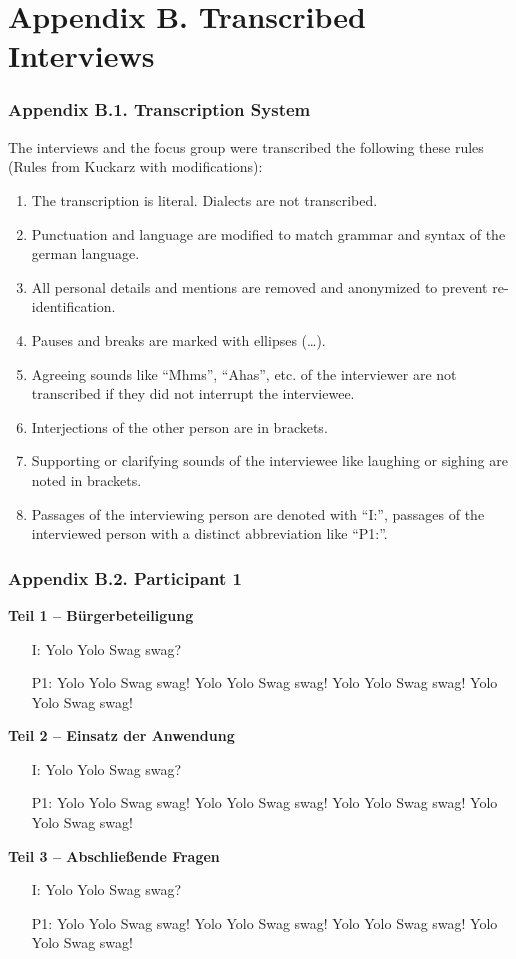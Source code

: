 \documentclass{sigchi}
\begin{document}
\twocolumn
\section{Appendix B. Transcribed Interviews}

\subsubsection{Appendix B.1. Transcription System}
The interviews and the focus group were transcribed the following these rules (Rules from Kuckarz \cite{kuckartz2007} with modifications):
\begin{enumerate}
    \item The transcription is literal. Dialects are not transcribed.
    \item Punctuation and language are modified to match grammar and syntax of the german language.
    \item All personal details and mentions are removed and anonymized to prevent re-identification.
    \item Pauses and breaks are marked with ellipses (\dots).
    \item Agreeing sounds like ``Mhms'', ``Ahas'', etc. of the interviewer are not transcribed if they did not interrupt the interviewee.
    \item Interjections of the other person are in brackets.
    \item Supporting or clarifying sounds of the interviewee like laughing or sighing are noted in brackets.
    \item Passages of the interviewing person are denoted with ``I:'', passages of the interviewed person with a distinct abbreviation like ``P1:''.
\end{enumerate}

\subsubsection{Appendix B.2. Participant 1}

\textbf{Teil 1 -- B{\"u}rgerbeteiligung}
\begin{itemize}
    \item[I:] Yolo Yolo Swag swag?
    \item[P1:] Yolo Yolo Swag swag! Yolo Yolo Swag swag! Yolo Yolo Swag swag! Yolo Yolo Swag swag!
\end{itemize}

\textbf{Teil 2 -- Einsatz der Anwendung}
\begin{itemize}
    \item[I:] Yolo Yolo Swag swag?
    \item[P1:] Yolo Yolo Swag swag! Yolo Yolo Swag swag! Yolo Yolo Swag swag! Yolo Yolo Swag swag!
\end{itemize}
\textbf{Teil 3 -- Abschlie{\ss}ende Fragen}
\begin{itemize}
    \item[I:] Yolo Yolo Swag swag?
    \item[P1:] Yolo Yolo Swag swag! Yolo Yolo Swag swag! Yolo Yolo Swag swag! Yolo Yolo Swag swag!
\end{itemize}
\end{document}
